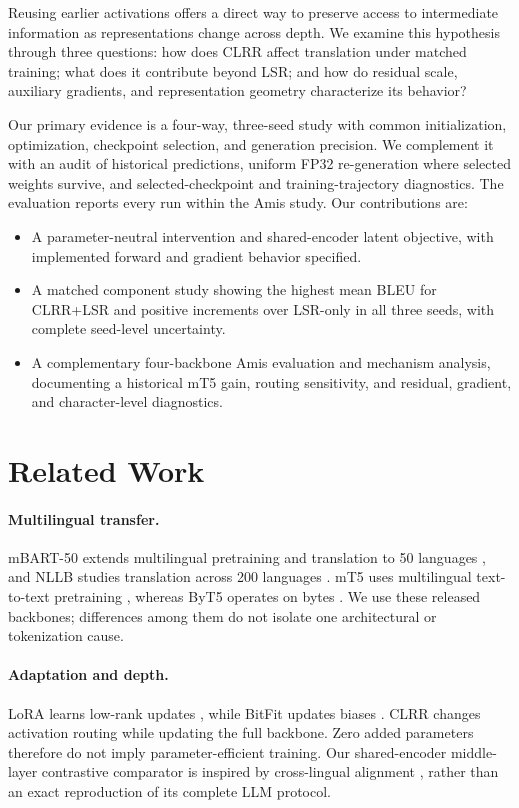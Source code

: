 \documentclass[11pt]{article}
\begin{document}
Reusing earlier activations offers a direct way to preserve access to intermediate information as representations change across depth. We examine this hypothesis through three questions: how does CLRR affect translation under matched training; what does it contribute beyond LSR; and how do residual scale, auxiliary gradients, and representation geometry characterize its behavior?

Our primary evidence is a four-way, three-seed study with common initialization, optimization, checkpoint selection, and generation precision. We complement it with an audit of historical predictions, uniform FP32 re-generation where selected weights survive, and selected-checkpoint and training-trajectory diagnostics. The evaluation reports every run within the Amis study. Our contributions are:
\begin{itemize}
\item A parameter-neutral intervention and shared-encoder latent objective, with implemented forward and gradient behavior specified.
\item A matched component study showing the highest mean BLEU for CLRR+LSR and positive increments over LSR-only in all three seeds, with complete seed-level uncertainty.
\item A complementary four-backbone Amis evaluation and mechanism analysis, documenting a historical mT5 gain, routing sensitivity, and residual, gradient, and character-level diagnostics.
\end{itemize}

\section{Related Work}
\paragraph{Multilingual transfer.}
mBART-50 extends multilingual pretraining and translation to 50 languages \citep{tang-etal-2020-multilingual}, and NLLB studies translation across 200 languages \citep{nllb-team-2022-no}. mT5 uses multilingual text-to-text pretraining \citep{xue-etal-2021-mt5}, whereas ByT5 operates on bytes \citep{xue-etal-2022-byt5}. We use these released backbones; differences among them do not isolate one architectural or tokenization cause.

\paragraph{Adaptation and depth.}
LoRA learns low-rank updates \citep{hu-etal-2022-lora}, while BitFit updates biases \citep{ben-zaken-etal-2022-bitfit}. CLRR changes activation routing while updating the full backbone. Zero added parameters therefore do not imply parameter-efficient training. Our shared-encoder middle-layer contrastive comparator is inspired by cross-lingual alignment \citep{liu-niehues-2025-middle}, rather than an exact reproduction of its complete LLM protocol.
\end{document}
